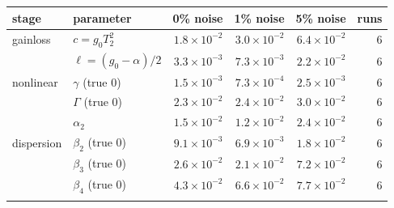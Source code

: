 \begin{tabular}{llrrrr}
\toprule
stage & parameter & 0\% noise & 1\% noise & 5\% noise & runs \\
\midrule
gainloss & $c=g_0T_2^2$ & $1.8\times10^{-2}$ & $3.0\times10^{-2}$ & $6.4\times10^{-2}$ & 6 \\
 & $\ell=(g_0-\alpha)/2$ & $3.3\times10^{-3}$ & $7.3\times10^{-3}$ & $2.2\times10^{-2}$ & 6 \\
\addlinespace
nonlinear & $\gamma$ (true 0) & $1.5\times10^{-3}$ & $7.3\times10^{-4}$ & $2.5\times10^{-3}$ & 6 \\
 & $\Gamma$ (true 0) & $2.3\times10^{-2}$ & $2.4\times10^{-2}$ & $3.0\times10^{-2}$ & 6 \\
 & $\alpha_2$ & $1.5\times10^{-2}$ & $1.2\times10^{-2}$ & $2.4\times10^{-2}$ & 6 \\
\addlinespace
dispersion & $\beta_2$ (true 0) & $9.1\times10^{-3}$ & $6.9\times10^{-3}$ & $1.8\times10^{-2}$ & 6 \\
 & $\beta_3$ (true 0) & $2.6\times10^{-2}$ & $2.1\times10^{-2}$ & $7.2\times10^{-2}$ & 6 \\
 & $\beta_4$ (true 0) & $4.3\times10^{-2}$ & $6.6\times10^{-2}$ & $7.7\times10^{-2}$ & 6 \\
\addlinespace
\bottomrule
\end{tabular}